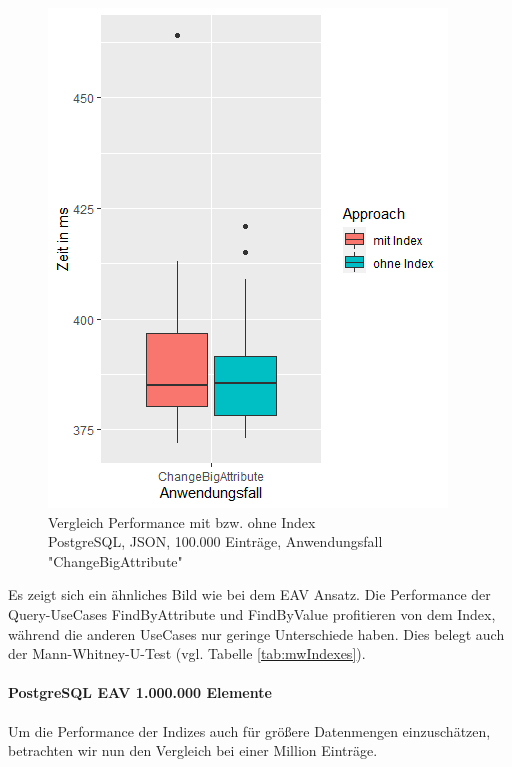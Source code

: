\begin{figure}[H]
\centering
\includegraphics[scale=0.5]{rStudioPictures/json100kIndexCBA400500.png}
\caption{Vergleich Performance mit bzw. ohne Index \\ PostgreSQL, JSON, 100.000 Einträge, Anwendungsfall "ChangeBigAttribute"}
\label{fig:json100kIndexCBA}
\end{figure}

Es zeigt sich ein ähnliches Bild wie bei dem EAV Ansatz. Die Performance der Query-UseCases FindByAttribute und FindByValue profitieren von dem Index, während die anderen UseCases nur geringe Unterschiede haben. Dies belegt auch der Mann-Whitney-U-Test (vgl. Tabelle \ref{tab:mwIndexes}).

\paragraph*{PostgreSQL EAV 1.000.000 Elemente}
Um die Performance der Indizes auch für größere Datenmengen einzuschätzen, betrachten wir nun den Vergleich bei einer Million Einträge.

